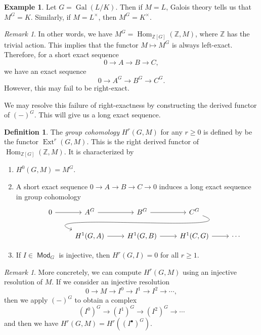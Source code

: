 \documentclass[leqno, openany]{memoir}
\theoremstyle{definition}
\newtheorem{defn}[thm]{Definition}
\newtheorem{exm}[thm]{Example}
\theoremstyle{remark}
\newtheorem{rmk}[thm]{Remark}
\theoremstyle{plain}
\theoremstyle{definition}
\theoremstyle{remark}
\newcommand{\Z}{\mathbb{Z}}
\DeclareMathOperator{\Hom}{Hom}
\DeclareMathOperator{\Gal}{Gal}
\DeclareMathOperator{\Ext}{Ext}
\DeclareMathOperator{\Mod}{\mathsf{Mod}}
\begin{document}
\begin{exm} Let $G = \Gal(L/K)$. Then if $M = L$, Galois theory tells us that
$M^G = K$. Similarly, if $M = L^{\times}$, then $M^G = K^{\times}$.  \end{exm}

\begin{rmk} In other words, we have $M^G = \Hom_{\Z[G]}(\Z, M)$, where $\Z$ has
    the trivial action. This implies that the functor $M \mapsto M^G$ is always
    left-exact. Therefore, for a short exact sequence \[ 0 \to A \to B \to C,
    \] we have an exact sequence \[ 0 \to A^G \to B^G \to C^G. \] However, this
may fail to be right-exact.  \end{rmk}

We may resolve this failure of right-exactness by constructing the derived
functor of ${(-)}^G$. This will give us a long exact sequence.

\begin{defn} The \textit{group cohomology} $H^r(G, M)$ for any $r \geq 0$ is
    defined by be the functor $\Ext^r(G, M)$. This is the right derived functor
    of $\Hom_{\Z[G]}(\Z, M)$. It is characterized by \begin{enumerate} \item
        $H^0(G, M) = M^G$.  \item A short exact sequence $0 \to A \to B \to C
        \to 0$ induces a long exact sequence in group cohomology
        \begin{equation*} \begin{tikzcd} 0 \arrow{r} & A^G \ar{r} & B^G \ar{r}
        & C^G \ar[out=-20,in=160]{dll} \\ & H^1(G,A) \ar{r} & H^1(G,B) \ar{r} &
    H^1(C,G) \ar{r} & \cdots \end{tikzcd} \end{equation*} \item If $I \in
    \Mod_G$ is injective, then $H^r(G, I) = 0$ for all $r \geq 1$.
    \end{enumerate} \end{defn}

\begin{rmk} More concretely, we can compute $H^r(G, M)$ using an injective
    resolution of $M$. If we consider an injective resolution \[ 0 \to M \to
        I^0 \to I^1 \to I^2 \to \cdots, \] then we apply ${(-)}^G$ to obtain a
        complex \[ {(I^0)}^G \to {(I^1)}^G \to {(I^2)}^G \to \cdots \] and then
    we have $H^r(G, M) = H^r({(I^{\bullet})}^G)$.  \end{rmk}
\end{document}
